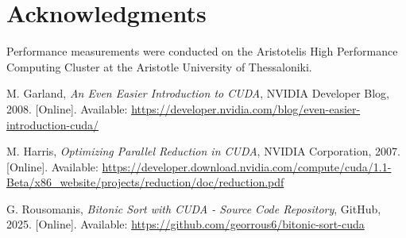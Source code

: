 \documentclass{article}
\begin{document}
\section*{Acknowledgments}
Performance measurements were conducted on the Aristotelis High Performance Computing Cluster at the Aristotle 
University of Thessaloniki.

\begin{thebibliography}{9}

M. Garland, 
\textit{An Even Easier Introduction to CUDA}, 
NVIDIA Developer Blog, 2008. [Online]. Available: 
\url{https://developer.nvidia.com/blog/even-easier-introduction-cuda/}

M. Harris, 
\textit{Optimizing Parallel Reduction in CUDA}, 
NVIDIA Corporation, 2007. [Online]. Available: 
\url{https://developer.download.nvidia.com/compute/cuda/1.1-Beta/x86_website/projects/reduction/doc/reduction.pdf}

G. Rousomanis, 
\textit{Bitonic Sort with CUDA - Source Code Repository}, 
GitHub, 2025. [Online]. Available: \url{https://github.com/georrous6/bitonic-sort-cuda}

\end{thebibliography}
\end{document}
